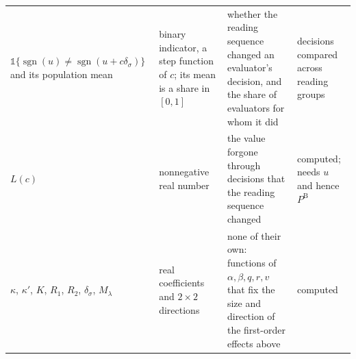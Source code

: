 \documentclass[11pt,a4paper]{article}
\newcommand{\PB}{P^{\mathrm{B}}}
\newcommand{\sgn}{\operatorname{sgn}}
\newcommand{\vv}{v}
\begin{document}
\begin{table}[htbp]
\begin{tabular}{@{}p{2.9cm}p{3.0cm}p{4.9cm}p{3.4cm}@{}}
\addlinespace
$\mathds{1}\{\sgn(u)\neq\sgn(u+c\delta_\sigma)\}$ and its population mean & binary indicator, a step function of $c$; its mean is a share in $[0,1]$ & whether the reading sequence changed an evaluator's decision, and the share of evaluators for whom it did & decisions compared across reading groups\\
\addlinespace
$L(c)$ & nonnegative real number & the value forgone through decisions that the reading sequence changed & computed; needs $u$ and hence $\PB$\\
\addlinespace
$\kappa$, $\kappa'$, $K$, $R_1$, $R_2$, $\delta_\sigma$, $M_\lambda$ & real coefficients and $2\times2$ directions & none of their own: functions of $\alpha,\beta,q,r,\vv$ that fix the size and direction of the first-order effects above & computed\\
\bottomrule
\end{tabular}
\end{table}
\end{document}
